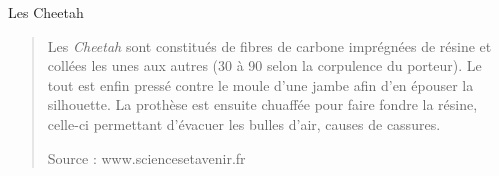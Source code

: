 \begin{doc}
	\label{doc:cheetah}
	\caption{Les Cheetah}
	
		\begin{quotation}
			Les \emph{Cheetah} sont constitués de fibres de carbone imprégnées de résine et collées les unes aux autres (30 à 90 selon la corpulence du porteur). Le tout est enfin pressé contre le moule d'une jambe afin d'en épouser la silhouette. La prothèse est ensuite chuaffée pour faire fondre la résine, celle-ci permettant d'évacuer les bulles d'air, causes de cassures.
	
	{\small Source : www.sciencesetavenir.fr}
		\end{quotation}
	
\end{doc}